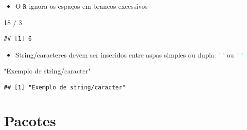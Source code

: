 \documentclass[
]{book}
\newenvironment{Shaded}{\begin{snugshade}}{\end{snugshade}}
\newcommand{\DecValTok}[1]{\textcolor[rgb]{0.00,0.00,0.81}{#1}}
\newcommand{\SpecialCharTok}[1]{\textcolor[rgb]{0.00,0.00,0.00}{#1}}
\newcommand{\StringTok}[1]{\textcolor[rgb]{0.31,0.60,0.02}{#1}}
\providecommand{\tightlist}{%
  \setlength{\itemsep}{0pt}\setlength{\parskip}{0pt}}
\begin{document}
\begin{itemize}
\tightlist
\item
  O \(\texttt{R}\) ignora os espaços em brancos excessivos
\end{itemize}

\begin{Shaded}
\begin{Highlighting}[]
\DecValTok{18}               \SpecialCharTok{/}              \DecValTok{3}
\end{Highlighting}
\end{Shaded}

\begin{verbatim}
## [1] 6
\end{verbatim}

\begin{itemize}
\tightlist
\item
  String/caracteres devem ser inseridos entre aspas simples ou dupla: \textcolor{cyan}{' '} ou \textcolor{cyan}{" "}
\end{itemize}

\begin{Shaded}
\begin{Highlighting}[]
\StringTok{"Exemplo de string/caracter"}
\end{Highlighting}
\end{Shaded}

\begin{verbatim}
## [1] "Exemplo de string/caracter"
\end{verbatim}

\hypertarget{pacotes}{%
\section{Pacotes}\label{pacotes}}
\end{document}
